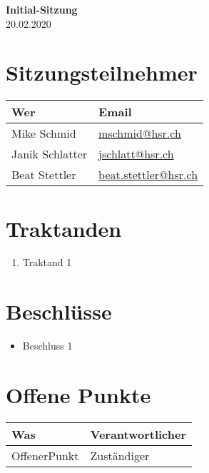 \documentclass[
	ngerman,
	toc=listof, %
	toc=bibliography, %
	footnotes=multiple, %
	parskip=half, %
	numbers=noendperiod %
]{scrartcl}
\newcommand{\titel}{Initial-Sitzung}
\newcommand{\datum}{20.02.2020}
\begin{document}
\begin{center}
    \LARGE \textbf{\titel} \\[2ex]
    \large \datum \\[2ex]
\end{center}

\section*{Sitzungsteilnehmer}
\begin{tabularx}{0.9\linewidth}{Xl}
	\toprule
	Wer & Email \\
	\midrule
	Mike Schmid & \scriptsize \url{mschmid@hsr.ch} \\
	Janik Schlatter & \scriptsize \url{jschlatt@hsr.ch} \\
	Beat Stettler & \scriptsize \url{beat.stettler@hsr.ch} \\
	\bottomrule
\end{tabularx}

\section*{Traktanden}
\begin{enumerate}
    \item Traktand 1
\end{enumerate}

\section*{Beschlüsse}
\begin{itemize}
    \item Beschluss 1
\end{itemize}

\section*{Offene Punkte}
\begin{tabularx}{0.9\linewidth}{Xl}
	\toprule
	Was & Verantwortlicher \\
	\midrule
	OffenerPunkt & Zuständiger \\
	\bottomrule
\end{tabularx}
\end{document}
